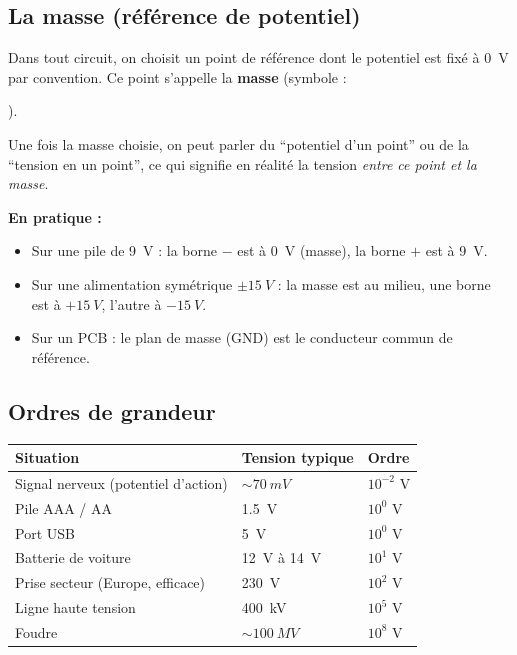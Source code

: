 \documentclass[12pt,a4paper,twoside]{book}
\begin{document}
\subsection{La masse (référence de potentiel)}

Dans tout circuit, on choisit un point de référence dont le potentiel est fixé à \SI{0}{V} par convention. Ce point s'appelle la \textbf{masse} (symbole : ).

Une fois la masse choisie, on peut parler du ``potentiel d'un point'' ou de la ``tension en un point'', ce qui signifie en réalité la tension \textit{entre ce point et la masse}.

\begin{pratique}
\textbf{En pratique :}
\begin{itemize}[nosep]
\item Sur une pile de \SI{9}{V} : la borne $-$ est à \SI{0}{V} (masse), la borne $+$ est à \SI{9}{V}.
\item Sur une alimentation symétrique $\pm\SI{15}{V}$ : la masse est au milieu, une borne est à $+\SI{15}{V}$, l'autre à $-\SI{15}{V}$.
\item Sur un PCB : le plan de masse (GND) est le conducteur commun de référence.
\end{itemize}
\end{pratique}

\subsection{Ordres de grandeur}

\begin{center}
\begin{tabular}{lll}
\toprule
\textbf{Situation} & \textbf{Tension typique} & \textbf{Ordre} \\
\midrule
Signal nerveux (potentiel d'action) & $\sim \SI{70}{mV}$ & $10^{-2}$ V \\
Pile AAA / AA & \SI{1.5}{V} & $10^{0}$ V \\
Port USB & \SI{5}{V} & $10^{0}$ V \\
Batterie de voiture & \SI{12}{V} à \SI{14}{V}& $10^{1}$ V \\
Prise secteur (Europe, efficace) & \SI{230}{V} & $10^{2}$ V \\
Ligne haute tension & \SI{400}{kV} & $10^{5}$ V \\
Foudre & $\sim \SI{100}{MV}$ & $10^{8}$ V \\
\bottomrule
\end{tabular}
\end{center}
\end{document}
